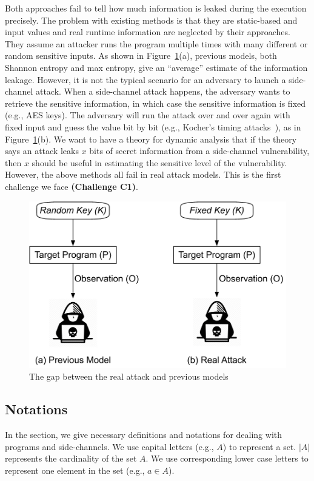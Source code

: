 Both approaches fail to tell how much information is leaked during the execution
precisely. The problem with existing methods is that they are static-based and
input values and real runtime information are neglected by their approaches. 
They assume an attacker runs
the program multiple times with many different or random sensitive inputs. As
shown in Figure~\ref{fig:gap}(a), previous models, both Shannon entropy and max
entropy, give an ``average'' estimate of the information leakage. However, it is
not the typical scenario for an adversary to launch a side-channel attack. When
a side-channel attack happens, the adversary wants to retrieve the sensitive
information, in which case the sensitive information is fixed (e.g., AES keys).
The adversary will run the attack over and over again with fixed input and 
guess the value bit by
bit (e.g., Kocher's timing attacks~\cite{kocher1996timing}), as in Figure~\ref{fig:gap}(b). We want to have a
theory for dynamic analysis that if the theory says an attack leaks $x$ bits of
secret information from a side-channel vulnerability, then $x$ should be useful
in estimating the sensitive level of the vulnerability. However, the above
methods all fail in real attack models. This is the first challenge we face
\textbf{(Challenge C1)}.

\begin{figure}
    \centering
    \includegraphics[width=.65\columnwidth]{./figures/RA.pdf}
\vspace*{-6pt}
    \caption{The gap between the real attack and previous models}\label{fig:gap}
\end{figure}


\subsection{Notations}
In the section, we give necessary definitions and notations for dealing with
programs and side-channels. We use capital letters (e.g., $A$) to represent a
set. $|A|$ represents the cardinality of the set $A$. We use corresponding lower case
letters to represent one element in the set (e.g., $a \in A$).

